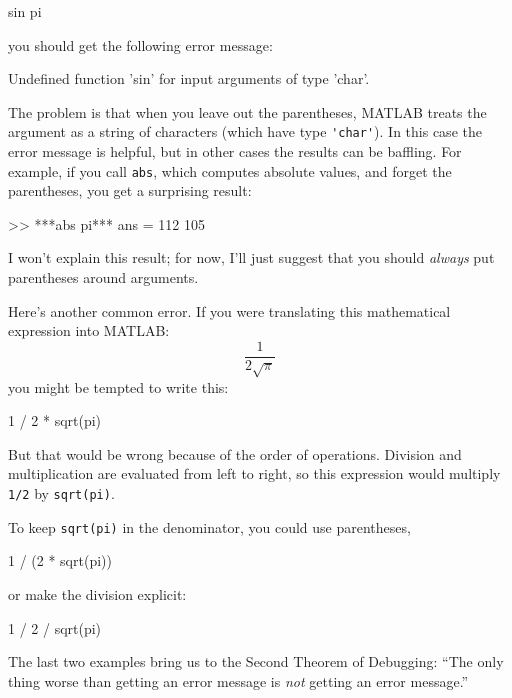 \begin{code}
sin pi
\end{code}
you should get the following error message:

\begin{stdout}
Undefined function 'sin' for input arguments of type 'char'.
\end{stdout}

The problem is that when you leave out the parentheses, MATLAB treats
the argument as a string of characters (which have type \lstinline{'char'}).
In this case the error message is helpful, but in other cases the results can be baffling.
For example, if you call \lstinline{abs}, which computes absolute values, and forget the parentheses, you get a surprising result:

\begin{code}
>> ***abs pi***
ans =  112   105
\end{code}

I won't explain this result; for now, I'll just suggest that you should \emph{always} put parentheses around arguments.


Here's another common error.
If you were translating this mathematical expression into MATLAB:
%
\[ \frac{1}{2 \sqrt \pi} \]
%
you might be tempted to write this:

\begin{code}
1 / 2 * sqrt(pi)
\end{code}

But that would be wrong because of the order of operations.  Division and multiplication are evaluated from left to right, so this expression would multiply \lstinline{1/2} by \lstinline{sqrt(pi)}.


To keep \lstinline{sqrt(pi)} in the denominator, you could use parentheses,

\begin{code}
1 / (2 * sqrt(pi))
\end{code}
or make the division explicit:

\begin{code}
1 / 2 / sqrt(pi)
\end{code}


The last two examples bring us to the Second Theorem of Debugging: ``The only thing worse than getting an error message is \emph{not} getting an error message.''

